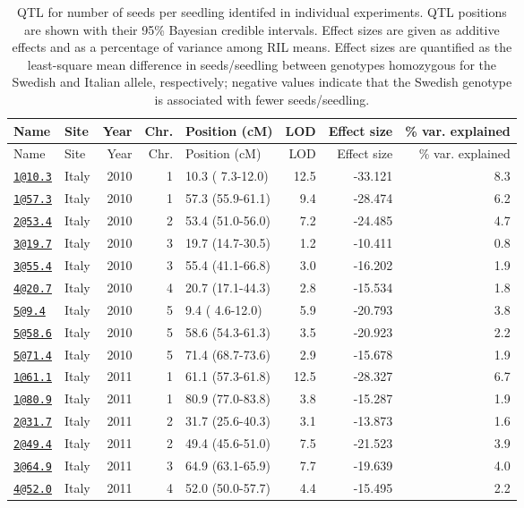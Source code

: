 \documentclass[]{article}
\begin{document}
\begin{longtable}[]{@{}llrrlrrr@{}}
\caption{\label{tab:individual-tfit-qtl}QTL for number of seeds per seedling identifed in individual experiments. QTL positions are shown with their 95\% Bayesian credible intervals. Effect sizes are given as additive effects and as a percentage of variance among RIL means. Effect sizes are quantified as the least-square mean difference in seeds/seedling between genotypes homozygous for the Swedish and Italian allele, respectively; negative values indicate that the Swedish genotype is associated with fewer seeds/seedling.}\tabularnewline
\toprule
Name & Site & Year & Chr. & Position (cM) & LOD & Effect size & \% var. explained\tabularnewline
\midrule
\endfirsthead
\toprule
Name & Site & Year & Chr. & Position (cM) & LOD & Effect size & \% var. explained\tabularnewline
\midrule
\endhead
\href{mailto:1@10.3}{\nolinkurl{1@10.3}} & Italy & 2010 & 1 & 10.3 ( 7.3-12.0) & 12.5 & -33.121 & 8.3\tabularnewline
\href{mailto:1@57.3}{\nolinkurl{1@57.3}} & Italy & 2010 & 1 & 57.3 (55.9-61.1) & 9.4 & -28.474 & 6.2\tabularnewline
\href{mailto:2@53.4}{\nolinkurl{2@53.4}} & Italy & 2010 & 2 & 53.4 (51.0-56.0) & 7.2 & -24.485 & 4.7\tabularnewline
\href{mailto:3@19.7}{\nolinkurl{3@19.7}} & Italy & 2010 & 3 & 19.7 (14.7-30.5) & 1.2 & -10.411 & 0.8\tabularnewline
\href{mailto:3@55.4}{\nolinkurl{3@55.4}} & Italy & 2010 & 3 & 55.4 (41.1-66.8) & 3.0 & -16.202 & 1.9\tabularnewline
\href{mailto:4@20.7}{\nolinkurl{4@20.7}} & Italy & 2010 & 4 & 20.7 (17.1-44.3) & 2.8 & -15.534 & 1.8\tabularnewline
\href{mailto:5@9.4}{\nolinkurl{5@9.4}} & Italy & 2010 & 5 & 9.4 ( 4.6-12.0) & 5.9 & -20.793 & 3.8\tabularnewline
\href{mailto:5@58.6}{\nolinkurl{5@58.6}} & Italy & 2010 & 5 & 58.6 (54.3-61.3) & 3.5 & -20.923 & 2.2\tabularnewline
\href{mailto:5@71.4}{\nolinkurl{5@71.4}} & Italy & 2010 & 5 & 71.4 (68.7-73.6) & 2.9 & -15.678 & 1.9\tabularnewline
\href{mailto:1@61.1}{\nolinkurl{1@61.1}} & Italy & 2011 & 1 & 61.1 (57.3-61.8) & 12.5 & -28.327 & 6.7\tabularnewline
\href{mailto:1@80.9}{\nolinkurl{1@80.9}} & Italy & 2011 & 1 & 80.9 (77.0-83.8) & 3.8 & -15.287 & 1.9\tabularnewline
\href{mailto:2@31.7}{\nolinkurl{2@31.7}} & Italy & 2011 & 2 & 31.7 (25.6-40.3) & 3.1 & -13.873 & 1.6\tabularnewline
\href{mailto:2@49.4}{\nolinkurl{2@49.4}} & Italy & 2011 & 2 & 49.4 (45.6-51.0) & 7.5 & -21.523 & 3.9\tabularnewline
\href{mailto:3@64.9}{\nolinkurl{3@64.9}} & Italy & 2011 & 3 & 64.9 (63.1-65.9) & 7.7 & -19.639 & 4.0\tabularnewline
\href{mailto:4@52.0}{\nolinkurl{4@52.0}} & Italy & 2011 & 4 & 52.0 (50.0-57.7) & 4.4 & -15.495 & 2.2\tabularnewline

\end{longtable}
\end{document}
